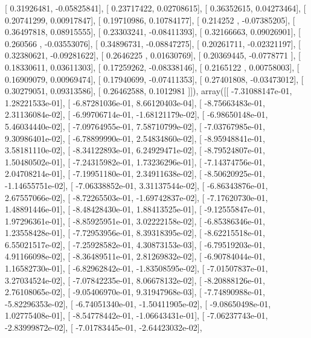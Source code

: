\documentclass{article}
\begin{document}
       [ 0.31926481, -0.05825841],
       [ 0.23717422,  0.02708615],
       [ 0.36352615,  0.04273464],
       [ 0.20741299,  0.00917847],
       [ 0.19710986,  0.10784177],
       [ 0.214252  , -0.07385205],
       [ 0.36497818,  0.08915555],
       [ 0.23303241, -0.08411393],
       [ 0.32166663,  0.09026901],
       [ 0.260566  , -0.03553076],
       [ 0.34896731, -0.08847275],
       [ 0.20261711, -0.02321197],
       [ 0.32380621, -0.09281622],
       [ 0.2646225 ,  0.01630769],
       [ 0.20369445, -0.0778771 ],
       [ 0.18330611,  0.03611303],
       [ 0.17259262, -0.08338146],
       [ 0.2165122 ,  0.00758003],
       [ 0.16909079,  0.00969474],
       [ 0.17940699, -0.07411353],
       [ 0.27401808, -0.03473012],
       [ 0.30279051,  0.09313586],
       [ 0.26462588,  0.1012981 ]]), array([[ -7.31088147e-01,   1.28221533e-01],
       [ -6.87281036e-01,   8.66120403e-04],
       [ -8.75663483e-01,   2.31136084e-02],
       [ -6.99706714e-01,  -1.68121179e-02],
       [ -6.98650148e-01,   5.46034440e-02],
       [ -7.09764955e-01,   7.58710799e-02],
       [ -7.03767985e-01,   9.30986401e-02],
       [ -6.78899990e-01,   2.54834860e-02],
       [ -8.95948841e-01,   3.58181110e-02],
       [ -8.34122893e-01,   6.24929471e-02],
       [ -8.79524807e-01,   1.50480502e-01],
       [ -7.24315982e-01,   1.73236296e-01],
       [ -7.14374756e-01,   2.04708214e-01],
       [ -7.19951180e-01,   2.34911638e-02],
       [ -8.50620925e-01,  -1.14655751e-02],
       [ -7.06338852e-01,   3.31137544e-02],
       [ -6.86343876e-01,   2.67557066e-02],
       [ -8.72265503e-01,  -1.69742837e-02],
       [ -7.17620730e-01,   1.48891446e-01],
       [ -8.48428430e-01,   1.88413525e-01],
       [ -9.12555847e-01,   1.97296361e-01],
       [ -8.85925951e-01,   3.02222158e-02],
       [ -6.85386346e-01,   1.23558428e-01],
       [ -7.72953956e-01,   8.39318395e-02],
       [ -8.62215518e-01,   6.55021517e-02],
       [ -7.25928582e-01,   4.30873153e-03],
       [ -6.79519203e-01,   4.91166098e-02],
       [ -8.36489511e-01,   2.81269832e-02],
       [ -6.90784044e-01,   1.16582730e-01],
       [ -6.82962842e-01,  -1.83508595e-02],
       [ -7.01507837e-01,   3.27034524e-02],
       [ -7.07842235e-01,   8.06678132e-02],
       [ -8.20888126e-01,   2.76108065e-02],
       [ -9.05406970e-01,   9.31947968e-03],
       [ -7.74890988e-01,  -5.82296353e-02],
       [ -6.74051340e-01,  -1.50411905e-02],
       [ -9.08650498e-01,   1.02775408e-01],
       [ -8.54778442e-01,  -1.06643431e-01],
       [ -7.06237743e-01,  -2.83999872e-02],
       [ -7.01783445e-01,  -2.64423032e-02],
\end{document}
